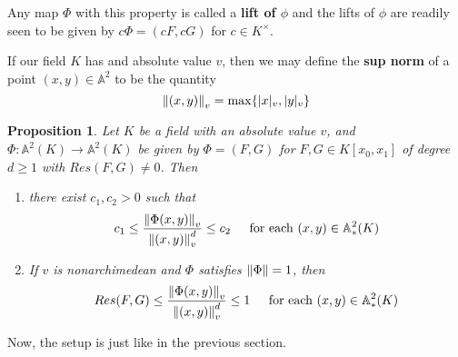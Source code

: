 \documentclass[12pt]{amsart}
\newtheorem{prop}[thm]{Proposition}
\theoremstyle{definition}
\theoremstyle{remark}
\theoremstyle{definition}
\newcommand{\AF}{\mathbb{A}}
\newcommand{\AFAF}{\mathbb{A}^2}
\begin{document}
Any map $\Phi$ with this property is called a \textbf{lift of $\phi$} and the lifts of $\phi$ are readily seen to be given by $c \Phi = (cF,cG)$ for $c \in K^{\times}$.

If our field $K$ has and absolute value $v$, then we may define the \textbf{sup norm} of a point $(x,y) \in \AF^2$ to be the quantity $$\norm{(x,y)}_v = \max\{|x|_v,|y|_v\}$$

\begin{prop}

Let $K$ be a field with an absolute value $v$, and $\Phi:\AF^2(K) \rightarrow \AF^2(K)$ be given by $\Phi = (F,G)$ for $F,G \in K[x_0,x_1]$ of degree $d \geq 1$ with $Res(F,G) \neq 0$. Then 
\begin{enumerate}
\item there exist $c_1, c_2 >0$ such that $$c_1 \leq \frac{\norm{\Phi(x,y)}_v}{\norm{(x,y)}_v^d} \leq c_2 \hspace{4mm }\text{ for each } (x,y) \in \AFAF_*(K)$$
\item If $v$ is nonarchimedean and $\Phi$ satisfies $\norm{\Phi} = 1$, then $$Res(F,G) \leq \frac{\norm{\Phi(x,y)}_v}{\norm{(x,y)}_v^d} \leq 1 \hspace{4mm }\text{ for each } (x,y) \in \AFAF_*(K)$$ 
 
\end{enumerate}

\end{prop} 

Now, the setup is just like in the previous section.
\end{document}
